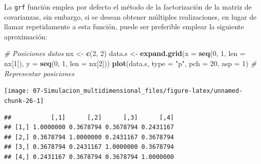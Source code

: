 \documentclass[]{book}
\newenvironment{Shaded}{\begin{snugshade}}{\end{snugshade}}
\newcommand{\KeywordTok}[1]{\textcolor[rgb]{0.13,0.29,0.53}{\textbf{#1}}}
\newcommand{\DataTypeTok}[1]{\textcolor[rgb]{0.13,0.29,0.53}{#1}}
\newcommand{\DecValTok}[1]{\textcolor[rgb]{0.00,0.00,0.81}{#1}}
\newcommand{\StringTok}[1]{\textcolor[rgb]{0.31,0.60,0.02}{#1}}
\newcommand{\CommentTok}[1]{\textcolor[rgb]{0.56,0.35,0.01}{\textit{#1}}}
\newcommand{\OperatorTok}[1]{\textcolor[rgb]{0.81,0.36,0.00}{\textbf{#1}}}
\newcommand{\NormalTok}[1]{#1}
\theoremstyle{definition}
\theoremstyle{definition}
\theoremstyle{definition}
\theoremstyle{remark}
\begin{document}
La \texttt{grf} función emplea por defecto el método de la factorización
de la matriz de covarianzas, sin embargo, si se desean obtener múltiples
realizaciones, en lugar de llamar repetidamente a esta función, puede
ser preferible emplear la siguiente aproximación:

\begin{Shaded}
\begin{Highlighting}[]
\CommentTok{# Posiciones datos}
\NormalTok{nx <-}\StringTok{ }\KeywordTok{c}\NormalTok{(}\DecValTok{2}\NormalTok{, }\DecValTok{2}\NormalTok{)}
\NormalTok{data.s <-}\StringTok{ }\KeywordTok{expand.grid}\NormalTok{(}\DataTypeTok{x =} \KeywordTok{seq}\NormalTok{(}\DecValTok{0}\NormalTok{, }\DecValTok{1}\NormalTok{, }\DataTypeTok{len =}\NormalTok{ nx[}\DecValTok{1}\NormalTok{]), }\DataTypeTok{y =} \KeywordTok{seq}\NormalTok{(}\DecValTok{0}\NormalTok{, }\DecValTok{1}\NormalTok{, }\DataTypeTok{len =}\NormalTok{ nx[}\DecValTok{2}\NormalTok{]))}
\KeywordTok{plot}\NormalTok{(data.s, }\DataTypeTok{type =} \StringTok{"p"}\NormalTok{, }\DataTypeTok{pch =} \DecValTok{20}\NormalTok{, }\DataTypeTok{asp =} \DecValTok{1}\NormalTok{) }\CommentTok{# Representar posiciones}
\end{Highlighting}
\end{Shaded}

\begin{center}\texttt{[image: 07-Simulacion\_multidimensional\_files/figure-latex/unnamed-chunk-26-1]} \end{center}

\begin{Shaded}
\end{Shaded}

\begin{verbatim}
##           [,1]      [,2]      [,3]      [,4]
## [1,] 1.0000000 0.3678794 0.3678794 0.2431167
## [2,] 0.3678794 1.0000000 0.2431167 0.3678794
## [3,] 0.3678794 0.2431167 1.0000000 0.3678794
## [4,] 0.2431167 0.3678794 0.3678794 1.0000000
\end{verbatim}
\end{document}

